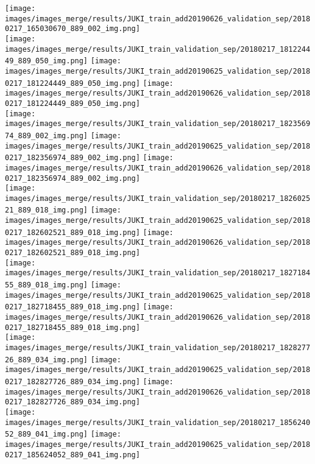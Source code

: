\begin{center}
\texttt{[image: images/images\_merge/results/JUKI\_train\_add20190626\_validation\_sep/20180217\_165030670\_889\_002\_img.png]}\\
\texttt{[image: images/images\_merge/results/JUKI\_train\_validation\_sep/20180217\_181224449\_889\_050\_img.png]}
\texttt{[image: images/images\_merge/results/JUKI\_train\_add20190625\_validation\_sep/20180217\_181224449\_889\_050\_img.png]}
\texttt{[image: images/images\_merge/results/JUKI\_train\_add20190626\_validation\_sep/20180217\_181224449\_889\_050\_img.png]}\\
\texttt{[image: images/images\_merge/results/JUKI\_train\_validation\_sep/20180217\_182356974\_889\_002\_img.png]}
\texttt{[image: images/images\_merge/results/JUKI\_train\_add20190625\_validation\_sep/20180217\_182356974\_889\_002\_img.png]}
\texttt{[image: images/images\_merge/results/JUKI\_train\_add20190626\_validation\_sep/20180217\_182356974\_889\_002\_img.png]}\\
\texttt{[image: images/images\_merge/results/JUKI\_train\_validation\_sep/20180217\_182602521\_889\_018\_img.png]}
\texttt{[image: images/images\_merge/results/JUKI\_train\_add20190625\_validation\_sep/20180217\_182602521\_889\_018\_img.png]}
\texttt{[image: images/images\_merge/results/JUKI\_train\_add20190626\_validation\_sep/20180217\_182602521\_889\_018\_img.png]}\\
\texttt{[image: images/images\_merge/results/JUKI\_train\_validation\_sep/20180217\_182718455\_889\_018\_img.png]}
\texttt{[image: images/images\_merge/results/JUKI\_train\_add20190625\_validation\_sep/20180217\_182718455\_889\_018\_img.png]}
\texttt{[image: images/images\_merge/results/JUKI\_train\_add20190626\_validation\_sep/20180217\_182718455\_889\_018\_img.png]}\\
\texttt{[image: images/images\_merge/results/JUKI\_train\_validation\_sep/20180217\_182827726\_889\_034\_img.png]}
\texttt{[image: images/images\_merge/results/JUKI\_train\_add20190625\_validation\_sep/20180217\_182827726\_889\_034\_img.png]}
\texttt{[image: images/images\_merge/results/JUKI\_train\_add20190626\_validation\_sep/20180217\_182827726\_889\_034\_img.png]}\\
\texttt{[image: images/images\_merge/results/JUKI\_train\_validation\_sep/20180217\_185624052\_889\_041\_img.png]}
\texttt{[image: images/images\_merge/results/JUKI\_train\_add20190625\_validation\_sep/20180217\_185624052\_889\_041\_img.png]}

\end{center}
